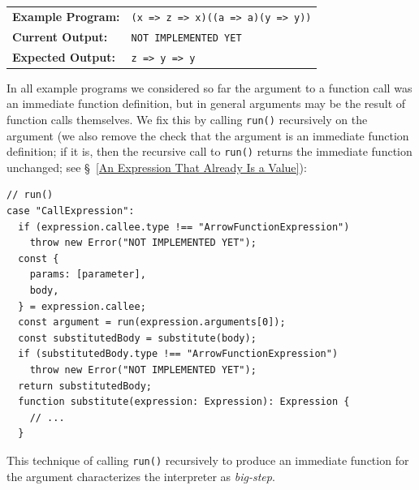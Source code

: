 \documentclass[12pt, oneside]{book}
\begin{document}
\begin{center}
\begin{tabular}{ll}
\textbf{Example Program:} & \texttt{(x => z => x)((a => a)(y => y))} \\
\textbf{Current Output:} & \texttt{NOT IMPLEMENTED YET} \\
\textbf{Expected Output:} & \texttt{z => y => y} \\
\end{tabular}
\end{center}

In all example programs we considered so far the argument to a function call was an immediate function definition, but in general arguments may be the result of function calls themselves. We fix this by calling \texttt{run()} recursively on the argument (we also remove the check that the argument is an immediate function definition; if it is, then the recursive call to \texttt{run()} returns the immediate function unchanged; see §~\ref{An Expression That Already Is a Value}):

\begin{verbatim}
// run()
case "CallExpression":
  if (expression.callee.type !== "ArrowFunctionExpression")
    throw new Error("NOT IMPLEMENTED YET");
  const {
    params: [parameter],
    body,
  } = expression.callee;
  const argument = run(expression.arguments[0]);
  const substitutedBody = substitute(body);
  if (substitutedBody.type !== "ArrowFunctionExpression")
    throw new Error("NOT IMPLEMENTED YET");
  return substitutedBody;
  function substitute(expression: Expression): Expression {
    // ...
  }
\end{verbatim}

\begin{mdframed}[frametitle = {Technical Terms}]
This technique of calling \texttt{run()} recursively to produce an immediate function for the argument characterizes the interpreter as \emph{big-step}.
\end{mdframed}
\end{document}
